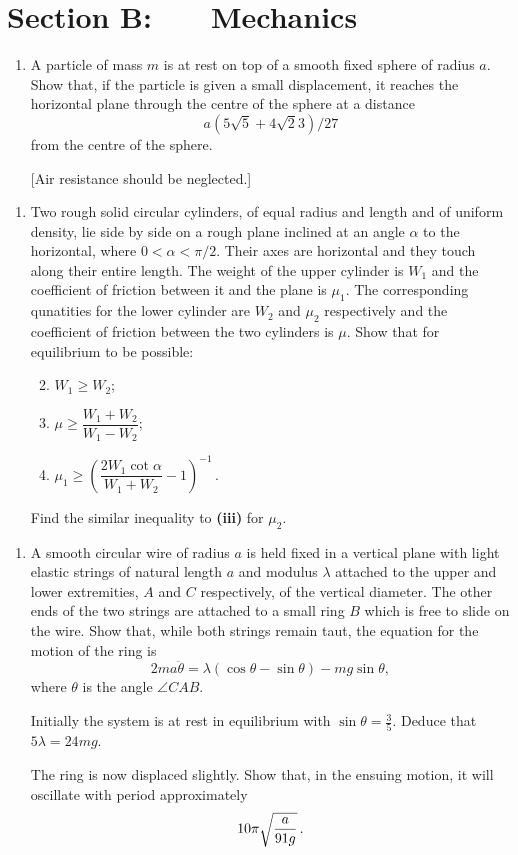 \documentclass[a4, 11pt]{report}
\newlength{\qspace}
\newcounter{qnumber}
\newenvironment{question}%
 {\vspace{\qspace}
  \begin{enumerate}[\bfseries 1\quad][10]%
    \setcounter{enumi}{\value{qnumber}}%
    \item%
 }
{
  \end{enumerate}
  \filbreak
  \stepcounter{qnumber}
 }
\newenvironment{questionparts}[1][1]%
 {
  \begin{enumerate}[\bfseries (i)]%
    \setcounter{enumii}{#1}
    \addtocounter{enumii}{-1}
    \setlength{\itemsep}{5mm}
    \setlength{\parskip}{8pt}
 }
 {
  \end{enumerate}
 }
\def\ge{\geqslant}
\begin{document}
		
	
\newpage
\section*{Section B: \ \ \ Mechanics}


	
\begin{question}
A particle of mass $m$ is at rest on top of a smooth fixed sphere of radius
$a$. Show that, if the particle is given a small displacement, it reaches
the horizontal plane through the centre of the sphere at a distance
$$a(5\sqrt5+4\sqrt23)/27$$
from the centre of the sphere.

[Air resistance should be neglected.]
	\end{question}
	
\begin{question}	
Two rough solid circular cylinders, of equal radius and length and of uniform
density, lie side by side on a rough plane inclined at an angle $\alpha$
to the horizontal, where $0<\alpha<\pi/2$. Their axes are horizontal and
they touch along their entire length. The weight of the upper cylinder is
$W_1$ and the coefficient of friction between it and the plane
is $\mu_1$. The corresponding qunatities for the lower cylinder are $W_2$
and $\mu_2$ respectively and the coefficient of friction between
the two cylinders is $\mu$. Show that for equilibrium to be possible:

\begin{questionparts}
\item $W_1\ge W_2$;

\item $\mu\geqslant\dfrac{W_1+W_2}{W_1-W_2}$;

\item $\mu_{1}\geqslant\left(\dfrac{2W_{1}\cot\alpha}{W_{1}+W_{2}}-1\right)^{-1}\,.$
\end{questionparts}

Find the similar inequality to \textbf{ (iii)} for $\mu_2$.
\end{question}


\begin{question}
A smooth circular wire of radius $a$
is held fixed in a vertical plane with light elastic
strings of natural length $a$ and modulus $\lambda$ attached to the upper and
lower extremities, $A$ and $C$ respectively, of the vertical diameter.
The other ends of the two strings are attached to a small ring $B$ which
is free to slide on the wire. Show that, while both strings remain taut,
the equation for the motion of the ring is
$$2ma \ddot\theta=\lambda(\cos\theta-\sin\theta)-mg\sin\theta,$$
where $\theta$ is the angle $ \angle{CAB}$.

Initially the system is at rest in equilibrium with
$\sin\theta=\frac{3}{5}$. Deduce that $5\lambda=24mg$.

The ring is now displaced slightly. Show that, in the ensuing motion, it will
oscillate with period approximately
$$10\pi\sqrt{a\over91g}\,.$$
\end{question}
	
\end{document}
